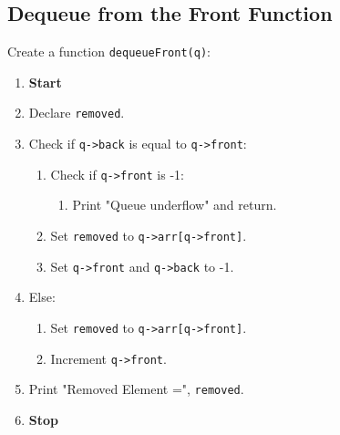 {  \subsection{Dequeue from the Front Function}
  Create a function \texttt{dequeueFront(q)}:
  \begin{enumerate}[label=\arabic*:,left=0pt]
    \item \textbf{Start}
    \item Declare \texttt{removed}.
    \item Check if \texttt{q->back} is equal to \texttt{q->front}:
          \begin{enumerate}[label=2.\arabic*.]
            \item Check if \texttt{q->front} is -1:
                  \begin{enumerate}[label=3.\arabic*.]
                    \item Print "Queue underflow" and return.
                  \end{enumerate}
            \item Set \texttt{removed} to \texttt{q->arr[q->front]}.
            \item Set \texttt{q->front} and \texttt{q->back} to -1.
          \end{enumerate}
    \item Else:
          \begin{enumerate}[label=2.\arabic*.]
            \item Set \texttt{removed} to \texttt{q->arr[q->front]}.
            \item Increment \texttt{q->front}.
          \end{enumerate}
    \item Print "Removed Element =", \texttt{removed}.
    \item \textbf{Stop}
  \end{enumerate}

}
